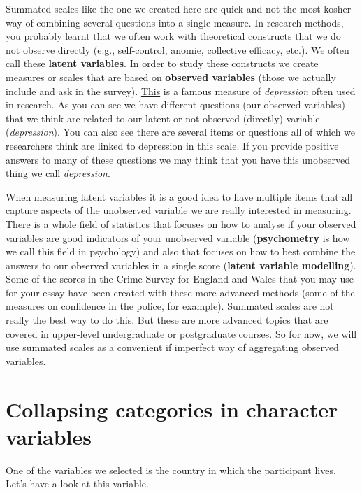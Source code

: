 \documentclass[
]{book}
\begin{document}
Summated scales like the one we created here are quick and not the most kosher way of combining several questions into a single measure. In research methods, you probably learnt that we often work with theoretical constructs that we do not observe directly (e.g., self-control, anomie, collective efficacy, etc.). We often call these \textbf{latent variables}. In order to study these constructs we create measures or scales that are based on \textbf{observed variables} (those we actually include and ask in the survey). \href{https://www.ismanet.org/doctoryourspirit/pdfs/Beck-Depression-Inventory-BDI.pdf}{This} is a famous measure of \emph{depression} often used in research. As you can see we have different questions (our observed variables) that we think are related to our latent or not observed (directly) variable (\emph{depression}). You can also see there are several items or questions all of which we researchers think are linked to depression in this scale. If you provide positive answers to many of these questions we may think that you have this unobserved thing we call \emph{depression}.

When measuring latent variables it is a good idea to have multiple items that all capture aspects of the unobserved variable we are really interested in measuring. There is a whole field of statistics that focuses on how to analyse if your observed variables are good indicators of your unobserved variable (\textbf{psychometry} is how we call this field in psychology) and also that focuses on how to best combine the answers to our observed variables in a single score (\textbf{latent variable modelling}). Some of the scores in the Crime Survey for England and Wales that you may use for your essay have been created with these more advanced methods (some of the measures on confidence in the police, for example). Summated scales are not really the best way to do this. But these are more advanced topics that are covered in upper-level undergraduate or postgraduate courses. So for now, we will use summated scales as a convenient if imperfect way of aggregating observed variables.

\section{Collapsing categories in character variables}\label{collapsing-categories-in-character-variables}

One of the variables we selected is the country in which the participant lives. Let's have a look at this variable.
\end{document}
